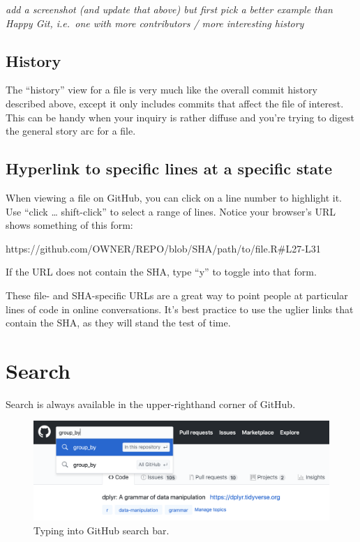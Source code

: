 \documentclass[
]{book}
\newenvironment{Shaded}{\begin{snugshade}}{\end{snugshade}}
\newcommand{\ExtensionTok}[1]{#1}
\begin{document}
\emph{add a screenshot (and update that above) but first pick a better example than Happy Git, i.e.~one with more contributors / more interesting history}

\subsection{History}\label{history}

The ``history'' view for a file is very much like the overall commit history described above, except it only includes commits that affect the file of interest. This can be handy when your inquiry is rather diffuse and you're trying to digest the general story arc for a file.

\subsection{Hyperlink to specific lines at a specific state}\label{hyperlink-to-specific-lines-at-a-specific-state}

When viewing a file on GitHub, you can click on a line number to highlight it. Use ``click \ldots{} shift-click'' to select a range of lines. Notice your browser's URL shows something of this form:

\begin{Shaded}
\begin{Highlighting}[]
\ExtensionTok{https://github.com/OWNER/REPO/blob/SHA/path/to/file.R\#L27{-}L31}
\end{Highlighting}
\end{Shaded}

If the URL does not contain the SHA, type ``y'' to toggle into that form.

These file- and SHA-specific URLs are a great way to point people at particular lines of code in online conversations. It's best practice to use the uglier links that contain the SHA, as they will stand the test of time.

\section{Search}\label{search}

Search is always available in the upper-righthand corner of GitHub.

\begin{figure}
\includegraphics[width=1\linewidth]{img/screenshots/github-repo-search} \caption{Typing into GitHub search bar.}\label{fig:github-repo-search}
\end{figure}
\end{document}

